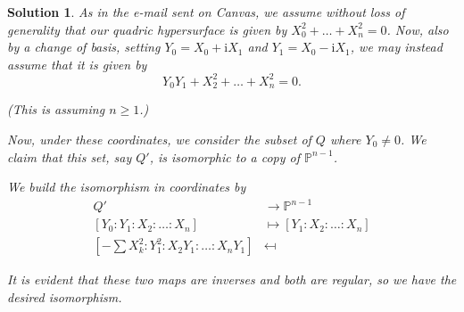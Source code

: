 \documentclass{article}
\theoremstyle{nonumberplain}
\newtheorem{sol}{Solution}
\newcommand{\PP}{\mathbb{P}}
\newcommand{\I}{\mathrm{i}}
\begin{document}
\begin{sol}
As in the e-mail sent on Canvas, we assume without loss of generality that our quadric hypersurface is given by $X_0^2 + \dots + X_n^2 = 0$. Now, also by a change of basis, setting $Y_0 = X_0 + \I X_1$ and $Y_1 = X_0 - \I X_1$, we may instead assume that it is given by
\begin{equation}
Y_0 Y_1 + X_2^2 + \dots + X_n^2 = 0.
\end{equation}

(This is assuming $n \geq 1$.)

Now, under these coordinates, we consider the subset of $Q$ where $Y_0 \neq 0$. We claim that this set, say $Q'$, is isomorphic to a copy of $\PP^{n-1}$.

We build the isomorphism in coordinates by
\begin{equation}
\begin{aligned}
Q' &\to \PP^{n-1}\\
[Y_0:Y_1:X_2:\dots:X_n] &\mapsto [Y_1:X_2:\dots:X_n]\\
[- {\textstyle \sum} X_k^2 : Y_1^2 : X_2 Y_1 : \dots : X_n Y_1] &\mapsfrom
\end{aligned}
\end{equation}

It is evident that these two maps are inverses and both are regular, so we have the desired isomorphism.
\end{sol}
\end{document}
